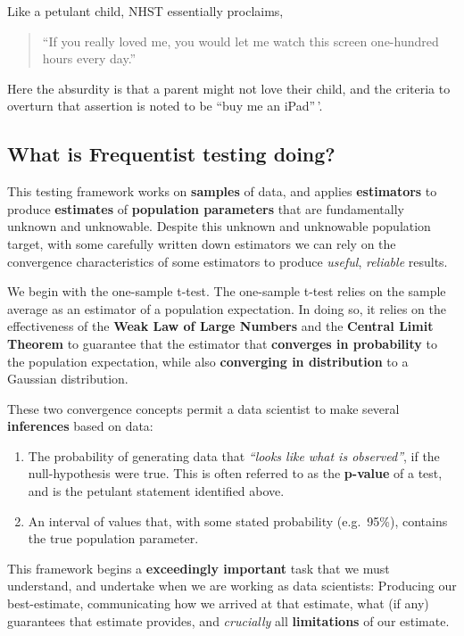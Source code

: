 \documentclass[
]{book}
\providecommand{\tightlist}{%
  \setlength{\itemsep}{0pt}\setlength{\parskip}{0pt}}
\theoremstyle{definition}
\theoremstyle{definition}
\theoremstyle{definition}
\theoremstyle{definition}
\theoremstyle{remark}
\begin{document}
Like a petulant child, NHST essentially proclaims,

\begin{quote}
``If you really loved me, you would let me watch this screen one-hundred hours every day.''
\end{quote}

Here the absurdity is that a parent might not love their child, and the criteria to overturn that assertion is noted to be ``buy me an iPad''\,'.

\subsection*{What is Frequentist testing doing?}\label{what-is-frequentist-testing-doing}

This testing framework works on \textbf{samples} of data, and applies \textbf{estimators} to produce \textbf{estimates} of \textbf{population parameters} that are fundamentally unknown and unknowable. Despite this unknown and unknowable population target, with some carefully written down estimators we can rely on the convergence characteristics of some estimators to produce \emph{useful}, \emph{reliable} results.

We begin with the one-sample t-test. The one-sample t-test relies on the sample average as an estimator of a population expectation. In doing so, it relies on the effectiveness of the \textbf{Weak Law of Large Numbers} and the \textbf{Central Limit Theorem} to guarantee that the estimator that \textbf{converges in probability} to the population expectation, while also \textbf{converging in distribution} to a Gaussian distribution.

These two convergence concepts permit a data scientist to make several \textbf{inferences} based on data:

\begin{enumerate}
\def\labelenumi{\arabic{enumi}.}
\tightlist
\item
  The probability of generating data that \emph{``looks like what is observed''}, if the null-hypothesis were true. This is often referred to as the \textbf{p-value} of a test, and is the petulant statement identified above.
\item
  An interval of values that, with some stated probability (e.g.~95\%), contains the true population parameter.
\end{enumerate}

This framework begins a \textbf{exceedingly important} task that we must understand, and undertake when we are working as data scientists: Producing our best-estimate, communicating how we arrived at that estimate, what (if any) guarantees that estimate provides, and \emph{crucially} all \textbf{limitations} of our estimate.
\end{document}
